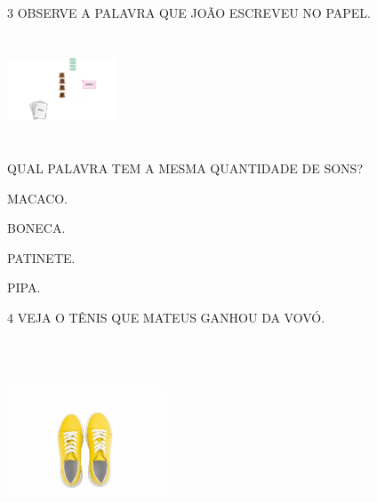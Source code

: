 \num{3} OBSERVE A PALAVRA QUE JOÃO ESCREVEU NO PAPEL.

\includegraphics[width=1.29792in,height=1.27986in]{media/image188.png}


QUAL PALAVRA TEM A MESMA QUANTIDADE DE SONS? 

\begin{escolha}
\item MACACO.

\item BONECA.

\item PATINETE.

\item PIPA.
\end{escolha}

\num{4} VEJA O TÊNIS QUE MATEUS GANHOU DA VOVÓ. 

\includegraphics[width=1.87986in,height=2.41667in]{media/image189.jpg}


